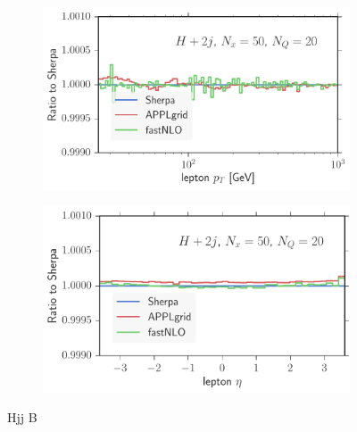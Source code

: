 \begin{figure}
\begin{subfigure}[]{0.49\textwidth}
	\includegraphics[width=\textwidth]{images/hjjb_lpt.pdf}
\end{subfigure}
\hfill
\begin{subfigure}[]{0.49\textwidth}
	\includegraphics[width=\textwidth]{images/hjjb_leta.pdf}
\end{subfigure}
\caption{Hjj B}
\end{figure}
%
